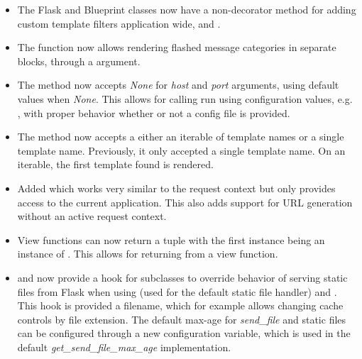\documentclass[a4paper,12pt]{sphinxmanual}
\begin{document}
\begin{itemize}
\item {} 
The Flask and Blueprint classes now have a non-decorator method for adding
custom template filters application wide,
{\hyperref[api:flask.Flask.add_template_filter]{}} and
{\hyperref[api:flask.Blueprint.add_app_template_filter]{}}.

\item {} 
The {\hyperref[api:flask.get_flashed_messages]{}} function now allows rendering flashed
message categories in separate blocks, through a 
argument.

\item {} 
The {\hyperref[api:flask.Flask.run]{}} method now accepts \emph{None} for \emph{host} and \emph{port}
arguments, using default values when \emph{None}.  This allows for calling run
using configuration values, e.g. , with proper behavior whether or not a config
file is provided.

\item {} 
The {\hyperref[api:flask.render_template]{}} method now accepts a either an iterable of
template names or a single template name.  Previously, it only accepted a
single template name.  On an iterable, the first template found is rendered.

\item {} 
Added {\hyperref[api:flask.Flask.app_context]{}} which works very similar to the
request context but only provides access to the current application.  This
also adds support for URL generation without an active request context.

\item {} 
View functions can now return a tuple with the first instance being an
instance of {\hyperref[api:flask.Response]{}}.  This allows for returning
 from a view function.

\item {} 
{\hyperref[api:flask.Flask]{}} and {\hyperref[api:flask.Blueprint]{}} now provide a
{\hyperref[api:flask.Flask.get_send_file_max_age]{}} hook for subclasses to override
behavior of serving static files from Flask when using
{\hyperref[api:flask.Flask.send_static_file]{}} (used for the default static file
handler) and .  This hook is provided a
filename, which for example allows changing cache controls by file extension.
The default max-age for \emph{send\_file} and static files can be configured
through a new  configuration variable, which is
used in the default \emph{get\_send\_file\_max\_age} implementation.


\end{itemize}
\end{document}
